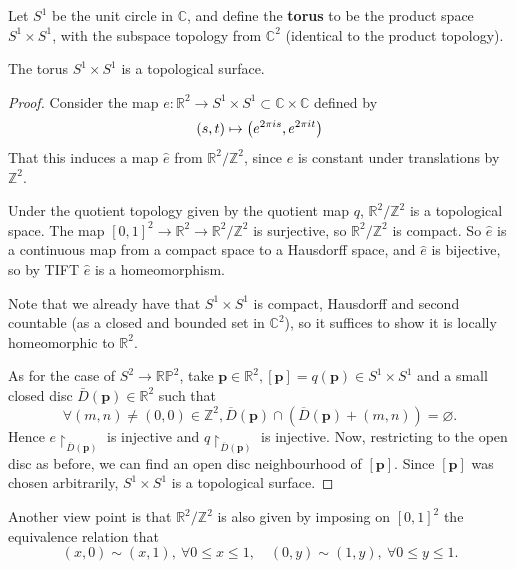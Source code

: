 \documentclass[a4paper,11pt]{article}
\begin{document}
\begin{example}
	Let \( S^1 \) be the unit circle in \( \mathbb C \), and define the \textbf{torus} to be the product space \( S^1 \times S^1 \), with the subspace topology from \( \mathbb C^2 \) (identical to the product topology).
	\begin{lemma}
		The torus $ S^1 \times S^1 $ is a topological surface.
	\end{lemma}
	\begin{proof}
		Consider the map \( e \colon \mathbb R^2 \to S^1 \times S^1 \subset \mathbb{C} \times \mathbb{C} \) defined by
		\[
			(s,t) \mapsto \qty(e^{2\pi i s}, e^{2 \pi i t})
		\]
		That this induces a map \( \hat e \) from \( {\mathbb R^2}/{\mathbb Z^2} \), since \( e \) is constant under translations by \( \mathbb Z^2 \).
		\begin{center}
		\end{center}
		Under the quotient topology given by the quotient map \( q \), \( {\mathbb R^2}/{\mathbb Z^2} \) is a topological space.
		The map \( [0,1]^2 \to \mathbb R^2 \to {\mathbb R^2}/{\mathbb Z^2} \) is surjective, so \( {\mathbb R^2}/{\mathbb Z^2} \) is compact.
		So \( \hat e \) is a continuous map from a compact space to a Hausdorff space, and \( \hat e \) is bijective, so by TIFT \( \hat e \) is a homeomorphism.

		Note that we already have that \( S^1 \times S^1 \) is compact, Hausdorff and second countable (as a closed and bounded set in \( \mathbb C^2 \)), so it suffices to show it is locally homeomorphic to \( \mathbb R^2 \).

		As for the case of $S^2\to \mathbb{R}\mathbb{P}^2$, take $\mathbf p\in \mathbb{R}^2, [\mathbf p]= q(\mathbf p)\in S^1\times S^1 $ and a small closed disc $ \bar{D}(\mathbf p)\in \mathbb{R}^2 $ such that 
		\[
			\forall	 (m,n)\neq (0,0)\in \mathbb{Z}^2, \overline{D}(\mathbf p) \cap (\overline{D}(\mathbf p)+(m,n)) = \varnothing. 
		\]
		Hence \( e\restriction_{\overline D(\mathbf p)} \) is injective and \( q\restriction_{\overline D(\mathbf p)} \) is injective.
		Now, restricting to the open disc as before, we can find an open disc neighbourhood of \( [\mathbf p] \).
		Since \( [\mathbf p] \) was chosen arbitrarily, \( S^1 \times S^1 \) is a topological surface.
	\end{proof}
	Another view point is that $ \mathbb{R}^{2}/\mathbb{Z}^2 $ is also given by imposing on $[0,1]^2$ the equivalence relation that 
\[
	(x,0) \sim (x,1),\ \forall 0\le x\le 1,\quad (0,y) \sim (1,y),\ \forall 0\le y\le 1.
\]
\begin{center}
\end{center}
\end{example}
\end{document}
